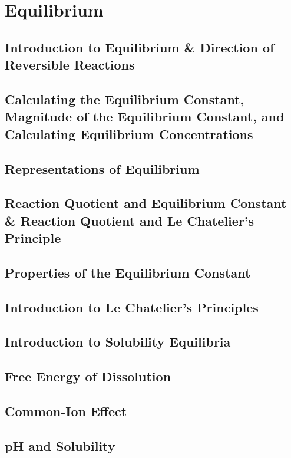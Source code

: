 \documentclass[../chem.tex]{subfiles}
\begin{document}
\chapter{Equilibrium}
\section{Introduction to Equilibrium \& Direction of Reversible Reactions}
\section{Calculating the Equilibrium Constant, Magnitude of the Equilibrium Constant, and Calculating Equilibrium Concentrations}
\section{Representations of Equilibrium}
\section{Reaction Quotient and Equilibrium Constant \& Reaction Quotient and Le Chatelier's Principle}
\section{Properties of the Equilibrium Constant}
\section{Introduction to Le Chatelier's Principles}
\section{Introduction to Solubility Equilibria}
\section{Free Energy of Dissolution}
\section{Common-Ion Effect}
\section{pH and Solubility}
\end{document}
